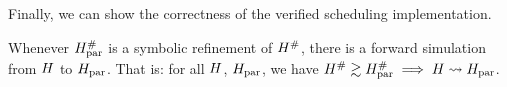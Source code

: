 {Finally, we can show the correctness of the verified scheduling implementation.


\begin{theorem}\label{thm:scheduler-correctness}
  Whenever $H_\text{par}^{\#}$ is a symbolic refinement of $H^{\#}$,
  there is a forward simulation from $H$ to $H_\text{par}$. That is: for all
  $H$, $H_\text{par}$, we have
  $H^{\#} \gtrsim H_\text{par}^{\#} \implies H \mathrel{\leadsto} H_\text{par}$.


\end{theorem}}
